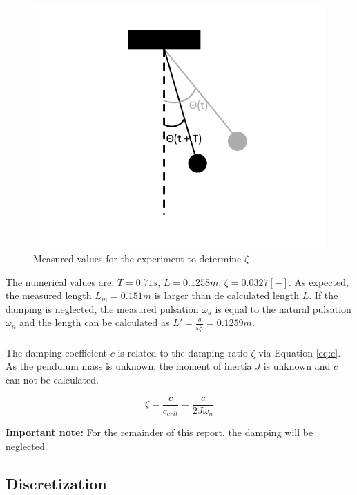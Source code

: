 \documentclass[a4paper,kul]{kulakarticle} %
\begin{document}
\begin{figure}[htp!]
	\centering
	\includegraphics[width=0.5\linewidth]{logdecrement.png}
	\caption{Measured values for the experiment to determine $\zeta$}
	\label{fig:logdecrement}
\end{figure}
\noindent The numerical values are: $T = 0.71s$, $L = 0.1258m$, $\zeta = 0.0327 [-]$. As expected, the measured length $L_m = 0.151m$ is larger than de calculated length $L$. If the damping is neglected, the measured pulsation $\omega_d$ is equal to the natural pulsation $\omega_n$ and the length can be calculated as $L' = \frac{g}{\omega_d^2} = 0.1259m$.
\\\\
The damping coefficient $c$ is related to the damping ratio $\zeta$ via Equation \ref{eq:c}. As the pendulum mass is unknown, the moment of inertia $J$ is unknown and $c$ can not be calculated. 

\begin{equation}
		\zeta = \frac{c}{c_{crit}} = \frac{c}{2J\omega_n}
		\label{eq:c}
\end{equation}

\noindent\textbf{Important note:} For the remainder of this report, the damping will be neglected.
\subsection{Discretization}
\end{document}
